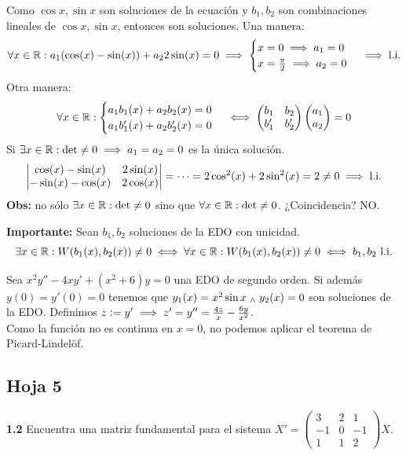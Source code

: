 Como $\cos{x}, \sin{x}$ son soluciones de la ecuación y $b_1, b_2$ son combinaciones lineales de $\cos{x}, \sin{x}$, entonces son soluciones.
Una manera: \[\forall x \in \mathbb{R} : a_1(\cos(x) - \sin(x)) + a_2 2 \sin(x) = 0 \implies \begin{cases}
		x= 0 \implies a_1 = 0 \\
		x= \frac{\pi}{2} \implies a_2 = 0
	\end{cases}\implies \text{l.i.}\]
Otra manera:
\[\forall x \in \mathbb{R} : \begin{cases}
		a_1b_1(x) + a_2b_2(x) = 0 \\
		a_1b_1'(x) + a_2b_2'(x) = 0
	\end{cases} \iff \begin{pmatrix}
		b_1  & b_2  \\
		b_1' & b_2'
	\end{pmatrix} \begin{pmatrix}
		a_1 \\
		a_2
	\end{pmatrix} = 0\]
Si $\exists x \in \mathbb{R} : \det \neq 0 \implies a_1 = a_2 = 0$ es la única solución.
\[\begin{vmatrix}
		\cos(x) - \sin(x)  & 2\sin(x) \\
		-\sin(x) - \cos(x) & 2\cos(x)
	\end{vmatrix} = \cdots = 2\cos^2(x) + 2\sin^2(x) = 2 \neq 0 \implies \text{l.i.}\]
\textbf{Obs:} no sólo $\exists x\in \mathbb{R} : \det \neq 0$ sino que $\forall x \in \mathbb{R} : \det \neq 0$. ¿Coincidencia? NO.

\textbf{Importante:} Sean $b_1, b_2$ soluciones de la EDO con unicidad.
\[\exists x \in \mathbb{R} : W(b_1(x), b_2(x)) \neq 0 \iff \forall x \in \mathbb{R} : W(b_1(x), b_2(x)) \neq 0 \iff b_1, b_2 \text{ l.i.}\]

Sea $x^2y'' - 4xy'+(x^2+6)y = 0$ una EDO de segundo orden. Si además $y(0) = y'(0) = 0$ tenemos que $y_1(x)=x^2\sin{x} \; _{\wedge} \; y_2(x)= 0$ son soluciones de la EDO. Definimos $z\vcentcolon= y' \implies z' = y'' = \frac{4z}{x} - \frac{6y}{x^2}$.\\

Como la función no es continua en $x=0$, no podemos aplicar el teorema de Picard-Lindelöf.

\subsection{Hoja 5}

\textbf{1.2} Encuentra una matriz fundamental para el sistema $X' = \begin{pmatrix} 3 & 2 & 1 \\ -1 & 0 & -1 \\ 1 & 1 & 2 \end{pmatrix}X$.

